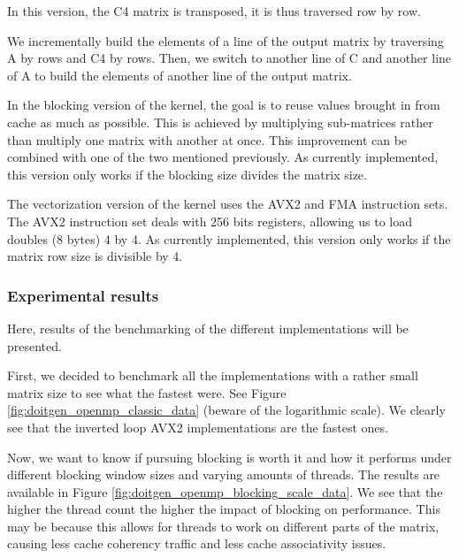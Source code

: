  In this version, the C4 matrix is transposed, it is thus traversed row by row.

 We incrementally build the elements of a line of the output matrix by traversing A by rows and C4 by rows. Then, we switch to another line of C and another line of A to build the elements of another line of the output matrix.

 In the blocking version of the kernel, the goal is to reuse values brought in from cache as much as possible. This is achieved by multiplying sub-matrices rather than multiply one matrix with another at once. This improvement can be combined with one of the two mentioned previously. As currently implemented, this version only works if the blocking size divides the matrix size.

The vectorization version of the kernel uses the AVX2 and FMA instruction sets. The AVX2 instruction set deals with 256 bits registers, allowing us to load doubles (8 bytes) 4 by 4. As currently implemented, this version only works if the matrix row size is divisible by 4.

\subsubsection{Experimental results}\label{experimental_results_openmp}
Here, results of the benchmarking of the different implementations will be presented.

First, we decided to benchmark all the implementations with a rather small matrix size to see what the fastest were. See Figure \ref{fig:doitgen_openmp_classic_data} (beware of the logarithmic scale). We clearly see that the inverted loop AVX2 implementations are the fastest ones.

Now, we want to know if pursuing blocking is worth it and how it performs under different blocking window sizes and varying amounts of threads. The results are available in Figure \ref{fig:doitgen_openmp_blocking_scale_data}. We see that the higher the thread count the higher the impact of blocking on performance. This may be because this allows for threads to work on different parts of the matrix, causing less cache coherency traffic and less cache associativity issues.

